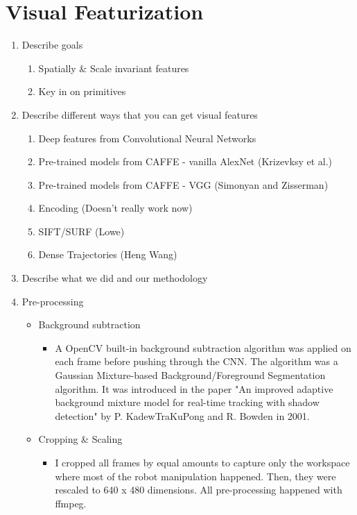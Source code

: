 \section{Visual Featurization}

\begin{enumerate}
\item Describe goals

\begin{enumerate}
\item Spatially \& Scale invariant features
\item Key in on primitives
\end{enumerate}

\item Describe different ways that you can get visual features
\begin{enumerate}
\item Deep features from Convolutional Neural Networks
\item Pre-trained models from CAFFE - vanilla AlexNet (Krizevksy et al.)
\item Pre-trained models from CAFFE - VGG (Simonyan and Zisserman)
\item Encoding (Doesn't really work now)
\item SIFT/SURF (Lowe)
\item Dense Trajectories (Heng Wang)
\end{enumerate}

\item Describe what we did and our methodology

\item Pre-processing
\begin{itemize}
\item Background subtraction
\begin{itemize}
\item A OpenCV built-in background subtraction algorithm was applied on each frame before pushing through the CNN. The algorithm was a Gaussian Mixture-based Background/Foreground Segmentation algorithm. It was introduced in the paper "An improved adaptive background mixture model for real-time tracking with shadow detection" by P. KadewTraKuPong and R. Bowden in 2001.
\end{itemize}

\item Cropping \& Scaling
\begin{itemize}
\item I cropped all frames by equal amounts to capture only the workspace where most of the robot manipulation happened. Then, they were rescaled to 640 x 480 dimensions. All pre-processing happened with ffmpeg.
\end{itemize}

\end{itemize}


\end{enumerate}